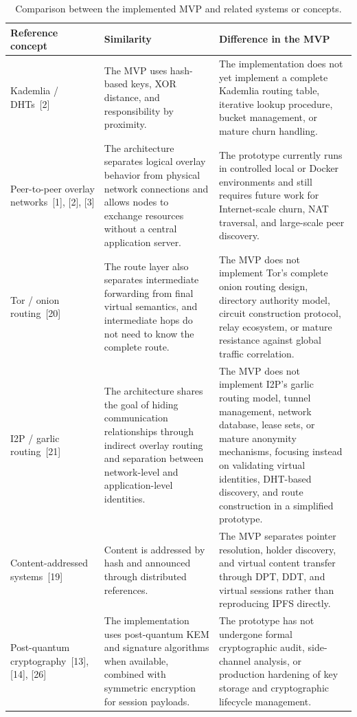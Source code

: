 \documentclass[12pt,a4paper]{article}
\begin{document}
\begin{table}[H]
\centering
\caption{Comparison between the implemented MVP and related systems or concepts.}
\label{tab:comparison-related-work}
\begin{tabularx}{\textwidth}{L{0.22\textwidth} Y Y}
\toprule
\textbf{Reference concept} & \textbf{Similarity} & \textbf{Difference in the MVP} \\
\midrule
Kademlia / DHTs~[2] &
The MVP uses hash-based keys, XOR distance, and responsibility by proximity. &
The implementation does not yet implement a complete Kademlia routing table, iterative lookup procedure, bucket management, or mature churn handling. \\

Peer-to-peer overlay networks~[1], [2], [3] &
The architecture separates logical overlay behavior from physical network connections and allows nodes to exchange resources without a central application server. &
The prototype currently runs in controlled local or Docker environments and still requires future work for Internet-scale churn, NAT traversal, and large-scale peer discovery. \\

Tor / onion routing~[20] &
The route layer also separates intermediate forwarding from final virtual semantics, and intermediate hops do not need to know the complete route. &
The MVP does not implement Tor's complete onion routing design, directory authority model, circuit construction protocol, relay ecosystem, or mature resistance against global traffic correlation. \\

I2P / garlic routing~[21] &
The architecture shares the goal of hiding communication relationships through indirect overlay routing and separation between network-level and application-level identities. &
The MVP does not implement I2P's garlic routing model, tunnel management, network database, lease sets, or mature anonymity mechanisms, focusing instead on validating virtual identities, DHT-based discovery, and route construction in a simplified prototype. \\

Content-addressed systems~[19] &
Content is addressed by hash and announced through distributed references. &
The MVP separates pointer resolution, holder discovery, and virtual content transfer through DPT, DDT, and virtual sessions rather than reproducing IPFS directly. \\

Post-quantum cryptography~[13], [14], [26] &
The implementation uses post-quantum KEM and signature algorithms when available, combined with symmetric encryption for session payloads. &
The prototype has not undergone formal cryptographic audit, side-channel analysis, or production hardening of key storage and cryptographic lifecycle management. \\
\bottomrule
\end{tabularx}
\end{table}
\end{document}
